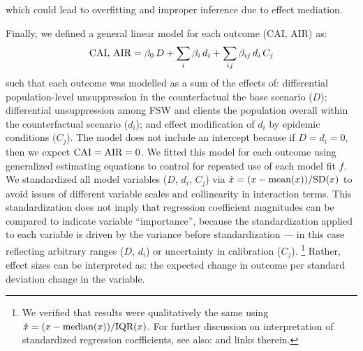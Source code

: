 which could lead to overfitting and improper inference due to effect mediation.
\par
Finally, we defined a general linear model for each outcome (CAI, AIR) as:
\begin{equation}\label{eq:art.2.glm}
  \textnormal{CAI, AIR} = \beta_0\,D
                 + \sum_i \beta_i\,d_i
                 + \sum_{ij} \beta_{ij}\,d_i\,C_j
\end{equation}
such that each outcome was modelled as a sum of the effects of:
differential population-level unsuppression in the counterfactual \vs the base scenario ($D$);
differential unsuppression among FSW and clients
\vs the population overall within the counterfactual scenario ($d_i$); and
effect modification of $d_i$ by epidemic conditions ($C_j$).
The model does not include an intercept because if $D = d_i = 0$,
then we expect $\textnormal{CAI} = \textnormal{AIR} = 0$.
We fitted this model for each outcome using generalized estimating equations \cite{Hojsgaard2006}
to control for repeated use of each model fit $f$.
We standardized all model variables ($D$, $d_i$, $C_j$) via
$\hat{x} = (x - \textnormal{mean}(x)) / \textnormal{SD}(x)$
to avoid issues of different variable scales and collinearity in interaction terms.
This standardization does not imply that
regression coefficient magnitudes can be compared to indicate variable ``importance'',
because the standardization applied to each variable is driven
by the variance before standardization
--- in this case reflecting arbitrary ranges ($D$, $d_i$) or uncertainty in calibration ($C_j$).%
\footnote{We verified that results were qualitatively the same using
  $\hat{x} = (x - \textnormal{median}(x)) / \textnormal{IQR}(x)$.
  For further discussion on interpretation of standardized regression coefficients,
  see also:  and links therein.}
Rather, effect sizes can be interpreted as:
the expected change in outcome per standard deviation change in the variable.
